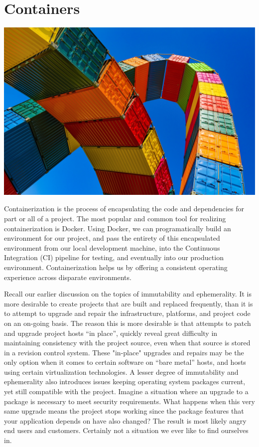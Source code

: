 \chapter{Containers}

\includegraphics[scale=0.85]{images/container-4203677_1920.jpg}

\justify{}
Containerization is the process of encapsulating the code and dependencies for part or all of a project. The most popular
and common tool for realizing containerization is Docker. Using Docker, we can programatically build an
environment for our project, and pass the entirety of this encapsulated environment from our local
development machine, into the Continuous Integration (CI) pipeline for testing, and eventually
into our production environment. Containerization helps us by offering a consistent operating
experience across disparate environments.

\justify{}
Recall our earlier discussion on the topics of immutability
and ephemerality. It is more desirable to create projects that are built
and replaced frequently, than it is to attempt to upgrade and repair the infrastructure, 
platforms, and project code on an on-going basis. The reason this is more desirable 
is that attempts to patch and upgrade project hosts ``in place'', quickly reveal
great difficulty in maintaining consistency with the project source, even when that source is stored in a revision control system. 
These "in-place" upgrades and repairs may be the only option when it comes to certain software on ``bare metal'' hosts, and
hosts using certain virtualization technologies. A lesser degree of immutability
and ephemerality also introduces issues keeping
operating system packages current, yet still compatible with the project. Imagine a situation where an upgrade to a package
is necessary to meet security requirements. What happens when this very same
upgrade means the project stops working since the package features that your application depends on have also changed?
The result is most likely angry end users and customers. Certainly not a situation we ever like to find ourselves in.

